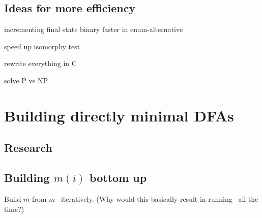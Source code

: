 \subsection{Ideas for more efficiency}

incrementing final state binary faster in enum-alternative

speed up isomorphy test

rewrite everything in C

solve P vs NP

\section{Building directly minimal DFAs}

\subsection{Research}

\subsection{Building $m(i)$ bottom up}

Build $m$ from $m$-\CompDist\ iteratively. (Why would this basically result in running \CompDist\ all the time?)
